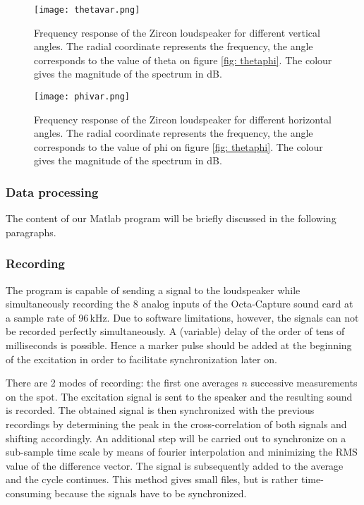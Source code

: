 \begin{figure}[h!]
  \centering
    \texttt{[image: thetavar.png]}
  \caption{Frequency response of the Zircon loudspeaker for different vertical angles. The radial coordinate represents the frequency, the angle corresponds to the value of theta on figure \ref{fig: thetaphi}. The colour gives the magnitude of the spectrum in dB.}
  \label{fig: thetavar}
\end{figure}

\begin{figure}[h!]
  \centering
    \texttt{[image: phivar.png]}
  \caption{Frequency response of the Zircon loudspeaker for different horizontal angles. The radial coordinate represents the frequency, the angle corresponds to the value of phi on figure \ref{fig: thetaphi}. The colour gives the magnitude of the spectrum in dB.}
  \label{fig: phivar}
\end{figure}




\subsubsection{Data processing}\label{processing}
The content of our Matlab program will be briefly discussed in the following paragraphs. 
\subsubsection{Recording}
The program is capable of sending a signal to the loudspeaker while simultaneously recording the 8 analog inputs of the Octa-Capture sound card at a sample rate of 96\,kHz. Due to software limitations, however, the signals can not be recorded perfectly simultaneously. A (variable) delay of the order of tens of  milliseconds is possible. Hence a marker pulse should be added at the beginning of the excitation in order to facilitate synchronization later on.

There are 2 modes of recording: the first one averages $n$ successive measurements on the spot. The excitation signal is sent to the speaker and the resulting sound is recorded. The obtained signal is then synchronized with the previous recordings by determining the peak in the cross-correlation of both signals and shifting accordingly. An additional step will be carried out to synchronize on a sub-sample time scale by means of fourier interpolation and minimizing the RMS value of the difference vector. The signal is subsequently added to the average and the cycle continues. This method gives small files, but is rather time-consuming because the signals have to be synchronized.


